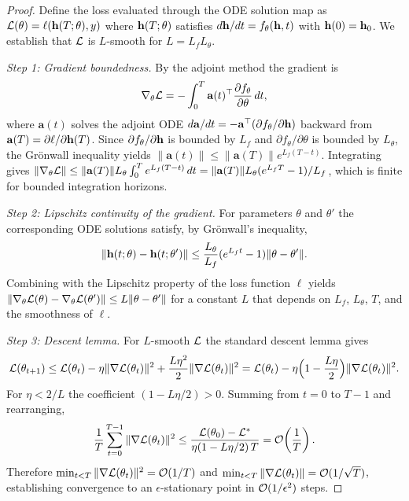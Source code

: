 \begin{proof}
Define the loss evaluated through the ODE solution map as $\mathcal{L}(\theta) = \ell(\mathbf{h}(T;\theta),y)$ where $\mathbf{h}(T;\theta)$ satisfies $d\mathbf{h}/dt = f_\theta(\mathbf{h},t)$ with $\mathbf{h}(0)=\mathbf{h}_0$. We establish that $\mathcal{L}$ is $L$-smooth for $L = L_f L_\theta$.

\textit{Step 1: Gradient boundedness.} By the adjoint method the gradient is
\begin{equation}
\nabla_\theta\mathcal{L} = -\int_0^T \mathbf{a}(t)^\top \frac{\partial f_\theta}{\partial\theta}\,dt,
\end{equation}
where $\mathbf{a}(t)$ solves the adjoint ODE $d\mathbf{a}/dt = -\mathbf{a}^\top(\partial f_\theta/\partial\mathbf{h})$ backward from $\mathbf{a}(T)=\partial\ell/\partial\mathbf{h}(T)$. Since $\partial f_\theta/\partial\mathbf{h}$ is bounded by $L_f$ and $\partial f_\theta/\partial\theta$ is bounded by $L_\theta$, the Gr\"{o}nwall inequality yields $\|\mathbf{a}(t)\|\le\|\mathbf{a}(T)\|e^{L_f(T-t)}$. Integrating gives $\|\nabla_\theta\mathcal{L}\|\le \|\mathbf{a}(T)\|L_\theta\int_0^T e^{L_f(T-t)}\,dt = \|\mathbf{a}(T)\|L_\theta(e^{L_f T}-1)/L_f$, which is finite for bounded integration horizons.

\textit{Step 2: Lipschitz continuity of the gradient.} For parameters $\theta$ and $\theta'$ the corresponding ODE solutions satisfy, by Gr\"{o}nwall's inequality,
\begin{equation}
\|\mathbf{h}(t;\theta)-\mathbf{h}(t;\theta')\| \le \frac{L_\theta}{L_f}(e^{L_f t}-1)\|\theta-\theta'\|.
\end{equation}
Combining with the Lipschitz property of the loss function $\ell$ yields $\|\nabla_\theta\mathcal{L}(\theta)-\nabla_\theta\mathcal{L}(\theta')\| \le L\|\theta-\theta'\|$ for a constant $L$ that depends on $L_f$, $L_\theta$, $T$, and the smoothness of $\ell$.

\textit{Step 3: Descent lemma.} For $L$-smooth $\mathcal{L}$ the standard descent lemma gives
\begin{equation}
\mathcal{L}(\theta_{t+1}) \le \mathcal{L}(\theta_t) - \eta\|\nabla\mathcal{L}(\theta_t)\|^2 + \frac{L\eta^2}{2}\|\nabla\mathcal{L}(\theta_t)\|^2
= \mathcal{L}(\theta_t) - \eta\Bigl(1-\frac{L\eta}{2}\Bigr)\|\nabla\mathcal{L}(\theta_t)\|^2.
\end{equation}
For $\eta < 2/L$ the coefficient $(1-L\eta/2)>0$. Summing from $t=0$ to $T-1$ and rearranging,
\begin{equation}
\frac{1}{T}\sum_{t=0}^{T-1}\|\nabla\mathcal{L}(\theta_t)\|^2
\le \frac{\mathcal{L}(\theta_0)-\mathcal{L}^*}{\eta(1-L\eta/2)\,T}
= \mathcal{O}\!\left(\frac{1}{T}\right).
\end{equation}
Therefore $\min_{t<T}\|\nabla\mathcal{L}(\theta_t)\|^2 = \mathcal{O}(1/T)$ and $\min_{t<T}\|\nabla\mathcal{L}(\theta_t)\| = \mathcal{O}(1/\sqrt{T})$, establishing convergence to an $\epsilon$-stationary point in $\mathcal{O}(1/\epsilon^2)$ steps.
\end{proof}


